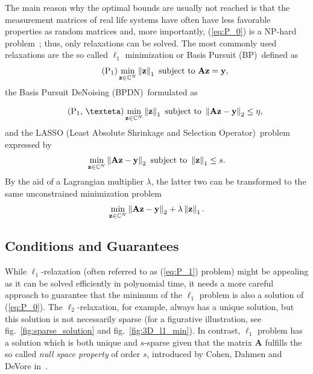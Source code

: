The main reason why the optimal bounds are usually not reached is that the measurement matrices of real life systems have often have less favorable properties as random matrices and, more importantly, (\ref{eq:P_0}) is a NP-hard problem~\citationneeded; thus, only relaxations can be solved. The most commonly used relaxations are the so called $\ell_1$ minimization or Basis Pursuit (BP)~\citationneeded defined as
\begin{equation}
    \tag{P\textsubscript{1}}\label{eq:P_1}
    \min_{\mathbf{z} \in \mathbb{C}^N} \norm{\mathbf{z}}_1 \text{ subject to } \mathbf{Az} = \mathbf{y},
\end{equation}
the Basis Pursuit DeNoising (BPDN)~\citationneeded formulated as

\begin{equation}
    \tag{P\textsubscript{1}, \texteta}\label{eq:P_1_noisy}
    \min_{\mathbf{z} \in \mathbb{C}^N} \norm{\mathbf{z}}_1 \text{ subject to } \norm{\mathbf{Az} - \mathbf{y}}_2 \le \eta,
\end{equation}
and the LASSO (Least Absolute Shrinkage and Selection Operator)~\citationneeded problem expressed by
\[\min_{\mathbf{z} \in \mathbb{C}^N} \left\lVert\mathbf{Az} - \mathbf{y}\right\rVert_2 \text{ subject to } \left\lVert\mathbf{z}\right\rVert_1 \le s.\]
By the aid of a Lagrangian multiplier $\lambda$, the latter two can be transformed to the same unconstrained minimization problem
\[\min_{\mathbf{z} \in \mathbb{C}^N} \left\lVert\mathbf{Az} - \mathbf{y}\right\rVert_2 + \lambda \left\lVert\mathbf{z}\right\rVert_1.\]

\subsection{Conditions and Guarantees}
While $\ell_1$-relaxation (often referred to as (\ref{eq:P_1}) problem) might be appealing as it can be solved efficiently in polynomial time, it needs a more careful approach to guarantee that the minimum of the $\ell_1$ problem is also a solution of (\ref{eq:P_0}). The $\ell_2$-relaxation, for example, always has a unique solution, but this solution is not necessarily sparse (for a figurative illustration, see fig.~\ref{fig:sparse_solution} and fig.~\ref{fig:3D_l1_min}). In contrast, $\ell_1$ problem has a solution which is both unique and $s$-sparse given that the matrix $\mathbf{A}$ fulfills the so called \textit{null space property} of order $s$, introduced by Cohen, Dahmen and DeVore in~\cite{cohen_compressed_2009}.

